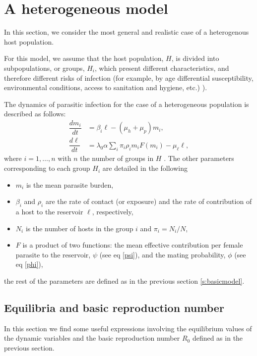 \documentclass[eng]{MMSB-class-eng}
\begin{document}
\section{A heterogeneous model}
{\color{red}
In this section, we consider the most general and realistic case of a heterogenous host population. 

For this model, we assume that the host population, $H$, is divided into subpopulations, or groups, $H_i$, which present different characteristics, and therefore different risks of infection (for example, by age differential susceptibility, environmental conditions, access to sanitation and hygiene, etc.) 
\cite{anderson1992infectious,anderson2014coverage,brooker2006contrasting,freeman2015associations,truscott2014modeling}).

The dynamics of parasitic infection for the case of a heterogeneous population is described as follows:
\begin{equation}\label{model2}
\begin{split}
\dfrac{dm_i}{dt}&=\beta_i \ell - (\mu_h+\mu_p) m_i,\\
\dfrac{d\ell}{dt}&= 
\lambda_0 \alpha
\sum_i  \pi_i \rho_i  m_i F(m_i)   - \mu_{\ell} \ell ,
\end{split}
\end{equation} 
where $i=1,\ldots,n$ with $n$ the number of groups in $H$ .     
The other parameters corresponding to each group $H_i$ are detailed in the following

\begin{itemize}
	\item $m_i$ is the mean parasite burden,
	\item $\beta_i$ and $\rho_i$  are the rate of contact (or exposure) and the rate of contribution
	of a host to the reservoir $\ell$, respectively,
	\item $N_{i}$ is the number of hosts in the group $i$ and $\pi_i=N_i/N$,
	\item $F$ is a product of two functions: the mean effective contribution per female parasite to the reservoir, $\psi$ (see eq \eqref{psi}), and the mating probability, $\phi$ (see eq \eqref{phi}),  
\end{itemize}
the rest of the parameters are defined as in the previous section \ref{s:basicmodel}.
}

\subsection{Equilibria and basic reproduction number}
In this section we find some useful expressions involving the equilibrium values of the dynamic variables and the basic reproduction number $R_0$ defined as in the previous section.
 
\end{document}
